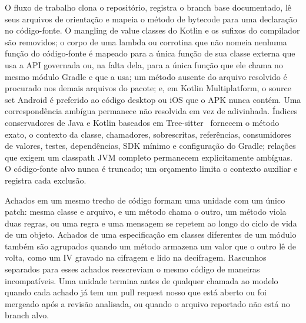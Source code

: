 \documentclass[conference]{IEEEtran}
\begin{document}
O fluxo de trabalho clona o repositório, registra o branch base documentado, lê
seus arquivos de orientação e mapeia o método de bytecode para uma declaração
no código-fonte. O mangling de value classes do Kotlin e os sufixos do
compilador são removidos; o corpo de uma lambda ou corrotina que não nomeia
nenhuma função do código-fonte é mapeado para a única função de sua classe
externa que usa a API governada ou, na falta dela, para a única função que ele
chama no mesmo módulo Gradle e que a usa; um método ausente do arquivo
resolvido é procurado nos demais arquivos do pacote; e, em Kotlin
Multiplatform, o source set Android é preferido ao código desktop ou iOS que o
APK nunca contém. Uma correspondência ambígua permanece não resolvida em vez de
adivinhada. Índices conservadores de Java e Kotlin baseados em Tree-sitter~\cite{treesitter}
fornecem o método exato, o contexto da classe, chamadores, sobrescritas,
referências, consumidores de valores, testes, dependências, SDK mínimo e
configuração do Gradle; relações que exigem um classpath JVM completo
permanecem explicitamente ambíguas. O código-fonte alvo nunca é truncado; um
orçamento limita o contexto auxiliar e registra cada exclusão.

Achados em um mesmo trecho de código formam uma unidade com um único patch:
mesma classe e arquivo, e um método chama o outro, um método viola duas regras,
ou uma regra e uma mensagem se repetem ao longo do ciclo de vida de um objeto.
Achados de uma especificação em classes diferentes de um módulo também são
agrupados quando um método armazena um valor que o outro lê de volta, como um
IV gravado na cifragem e lido na decifragem. Rascunhos separados para esses
achados reescreviam o mesmo código de maneiras incompatíveis. Uma unidade
termina antes de qualquer chamada ao modelo quando cada achado já tem um pull
request nosso que está aberto ou foi mergeado após a revisão analisada, ou
quando o arquivo reportado não está no branch alvo.
\end{document}

